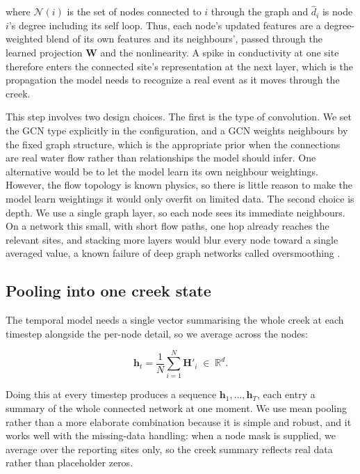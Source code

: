 \documentclass{article}
\begin{document}
where $\mathcal{N}(i)$ is the set of nodes connected to $i$ through the graph and
$\hat{d}_i$ is node $i$'s degree including its self loop. Thus, each node's
updated features are a degree-weighted blend of its own features and its
neighbours', passed through the learned projection $\mathbf{W}$ and the
nonlinearity. A spike in conductivity at one site therefore enters the
connected site's representation at the next layer, which is the propagation
the model needs to recognize a real event as it moves through the creek.

This step involves two design choices. The first is the type of convolution.
We set the GCN type explicitly in the configuration, and a GCN weights
neighbours by the fixed graph structure, which is the appropriate prior when
the connections are real water flow rather than relationships the model should
infer. One alternative would be to let the model learn its own neighbour
weightings. However, the flow topology is known physics, so there is little
reason to make the model learn weightings it would only overfit on limited
data. The second choice is depth. We use a single graph layer, so each node
sees its immediate neighbours. On a network this small, with short flow paths,
one hop already reaches the relevant sites, and stacking more layers would
blur every node toward a single averaged value, a known failure of deep graph
networks called oversmoothing \citep{li2018deeper}.

\subsection{Pooling into one creek state}
\label{sec:pooling}

The temporal model needs a single vector summarising the whole creek at each
timestep alongside the per-node detail, so we average across the nodes:

\begin{equation}
  \label{eq:pooling}
  \mathbf{h}_t = \frac{1}{N} \sum_{i=1}^{N} \mathbf{H}'_i \;\in\; \mathbb{R}^{d}.
\end{equation}

Doing this at every timestep produces a sequence $\mathbf{h}_1, \dots,
\mathbf{h}_T$, each entry a summary of the whole connected network at one
moment. We use mean pooling rather than a more elaborate combination because it
is simple and robust, and it works well with the missing-data handling: when a
node mask is supplied, we average over the reporting sites only, so the creek
summary reflects real data rather than placeholder zeros.
\end{document}
